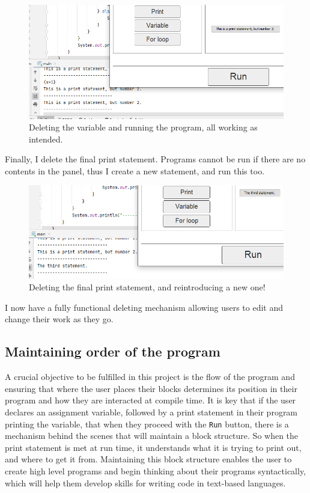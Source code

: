 \documentclass[a4paper, 12pt]{article}
\begin{document}
            \begin{figure}[h]
                \centering
                \includegraphics[width=120mm]{delete_block3.png}
                \caption{Deleting the variable and running the program, all working as intended.}
            \end{figure}

            Finally, I delete the final print statement. Programs cannot be run if there are no
            contents in the panel, thus I create a new statement, and run this too.

            \begin{figure}[h]
                \centering
                \includegraphics[width=120mm]{delete_block4.png}
                \caption{Deleting the final print statement, and reintroducing a new one!}
            \end{figure}

            I now have a fully functional deleting mechanism allowing users to edit and change
            their work as they go.

        \clearpage
        \subsection{Maintaining order of the program}
            A crucial objective to be fulfilled in this project is the flow of the program and ensuring
            that where the user places their blocks determines its position in their program and
            how they are interacted at compile time. It is key that if the user declares an assignment
            variable, followed by a print statement in their program printing the variable, that when
            they proceed with the \texttt{Run} button, there is a mechanism behind the scenes that will
            maintain a block structure. So when the print statement is met at run time, it understands
            what it is trying to print out, and where to get it from. Maintaining this block structure
            enables the user to create high level programs and begin thinking about their programs
            syntactically, which will help them develop skills for writing code in text-based languages. \\
\end{document}
